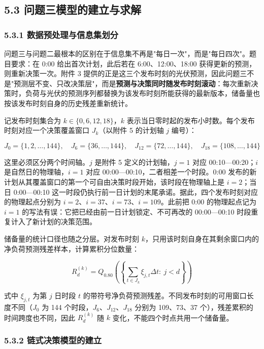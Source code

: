 \documentclass[12pt,a4paper]{ctexart}
\begin{document}
\subsection*{5.3 问题三模型的建立与求解}

\subsubsection*{5.3.1 数据预处理与信息集划分}

问题三与问题二最根本的区别在于信息集不再是"每日一次"，而是"每日四次"。题目要求：在 0:00 给出首次计划，此后若在 6:00、12:00、18:00 获得更新的预测，则重新决策一次。附件 3 提供的正是这三个发布时刻的光伏预测，因此问题三不是"预测层不变、只改决策层"，而是\textbf{预测与决策同时随发布时刻滚动}：每次重新决策时，负荷与光伏的预测序列都替换为该发布时刻所能获得的最新版本，储备量也按该发布时刻自身的历史残差重新统计。

记发布时刻集合为 $k\in\{0,6,12,18\}$，$k$ 表示当日零时起的发布小时数。每个发布时刻对应一个决策覆盖窗口 $J_k$（以附件 5 的计划轴 $j$ 编号）：

\begin{equation}
J_0=\{1,2,\dots,144\},\quad J_6=\{36,\dots,144\},\quad J_{12}=\{72,\dots,144\},\quad J_{18}=\{108,\dots,144\}
\end{equation}

这里必须区分两个时间轴。$j$ 是附件 5 定义的计划轴，$j=1$ 对应 00:10—00:20；$i$ 是自然日的物理轴，$i=1$ 对应 00:00—00:10，二者相差一个时段。0:00 发布的新计划从其覆盖窗口的第一个可自由决策时段开始，该时段在物理轴上是 $i=2$；当日 0:00—00:10 这一时段仍执行前一日计划的末尾承诺。据此，四个发布时刻对应的物理起点分别为 $i=2$、$i=37$、$i=73$、$i=109$。此前把 0:00 的物理起点记为 $i=1$ 的写法有误：它把已经由前一日计划锁定、不可再改的 00:00—00:10 时段重复计入了新计划的决策范围。

储备量的统计口径也随之分层。对发布时刻 $k$，只用该时刻自身在其剩余窗口内的净负荷预测残差样本，计算累积分位数量：

\begin{equation}
R_d^{(k)}=Q_{0.80}\left(\left\{\sum_{t\in J_k}\xi_{j,t}\Delta t:\ j<d\right\}\right)
\end{equation}

式中 $\xi_{j,t}$ 为第 $j$ 日时段 $t$ 的带符号净负荷预测残差。不同发布时刻的可用窗口长度不同（$J_0$ 为 144 个时段，$J_6$、$J_{12}$、$J_{18}$ 分别为 109、73、37 个），残差累积的时间跨度也不同，因此 $R_d^{(k)}$ 随 $k$ 变化，不能四个时点共用一个储备量。

\subsubsection*{5.3.2 链式决策模型的建立}
\end{document}
